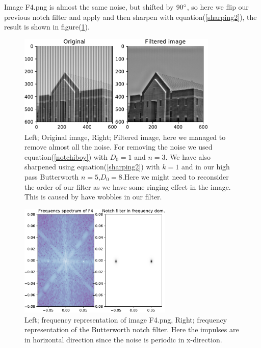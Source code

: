 {%

Image F4.png is almost the same noise, but shifted by $90\degree$, so here we flip our previous notch filter and apply and then sharpen with equation(\ref{sharping2}), the result is shown in figure(\ref{C7F4}).

\begin{figure}[!htb]
    {\centering
        \includegraphics[width=0.85\textwidth]{C7F4.pdf}
        \caption{Left; Original image, Right; Filtered image, here we managed to remove almost all the noise. For removing the noise we used equation(\ref{notchiboy}) with $D_{0} = 1$ and $n = 3$. We have also sharpened using equation(\ref{sharping2}) with $k = 1$ and in our high pass Butterworth $n = 5$,$D_{0} = 8$.Here we might need to reconsider the order of our filter as we have some ringing effect in the image. This is caused by have wobbles in our filter.}
        \label{C7F4}
    \par}
    \end{figure}

    \begin{figure}[!htb]
        {\centering
            \includegraphics[width=0.65\textwidth]{C7F4freq.pdf}
            \caption{Left; frequency representation of image F4.png, Right; frequency representation of the Butterworth notch filter. Here the impulses are in horizontal direction since the noise is periodic in x-direction.}
            \label{C7F4freq}
        \par}
        \end{figure}


}
